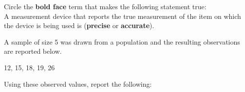 \documentclass[addpoints]{examsetup}\usepackage[]{graphicx}\usepackage[]{color}
\begin{document}



\examCoverPage

\begin{questions}

\question[2] 

Circle the \textbf{bold face} term that makes the following statement true: \\

A measurement device that reports the true measurement of the item on which the device is being used is (\textbf{precise} or \textbf{accurate}).

\vspace{1cm}

\question 



A sample of size 5 was drawn from a population and the resulting observations are reported below. 
\begin{center}
12, 15, 18, 19, 26
\end{center}
Using these observed values, report the following:
\vspace{1cm}

\end{questions}
\end{document}
